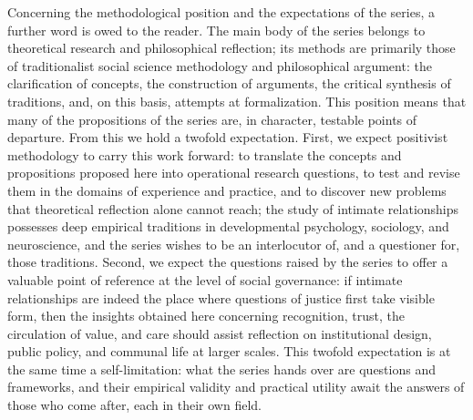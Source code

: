 \documentclass[11pt]{book}
\begin{document}
Concerning the methodological position and the expectations of the series, a further word is owed to the reader. The main body of the series belongs to theoretical research and philosophical reflection; its methods are primarily those of traditionalist social science methodology and philosophical argument: the clarification of concepts, the construction of arguments, the critical synthesis of traditions, and, on this basis, attempts at formalization. This position means that many of the propositions of the series are, in character, testable points of departure. From this we hold a twofold expectation. First, we expect positivist methodology to carry this work forward: to translate the concepts and propositions proposed here into operational research questions, to test and revise them in the domains of experience and practice, and to discover new problems that theoretical reflection alone cannot reach; the study of intimate relationships possesses deep empirical traditions in developmental psychology, sociology, and neuroscience, and the series wishes to be an interlocutor of, and a questioner for, those traditions. Second, we expect the questions raised by the series to offer a valuable point of reference at the level of social governance: if intimate relationships are indeed the place where questions of justice first take visible form, then the insights obtained here concerning recognition, trust, the circulation of value, and care should assist reflection on institutional design, public policy, and communal life at larger scales. This twofold expectation is at the same time a self-limitation: what the series hands over are questions and frameworks, and their empirical validity and practical utility await the answers of those who come after, each in their own field.
\end{document}
